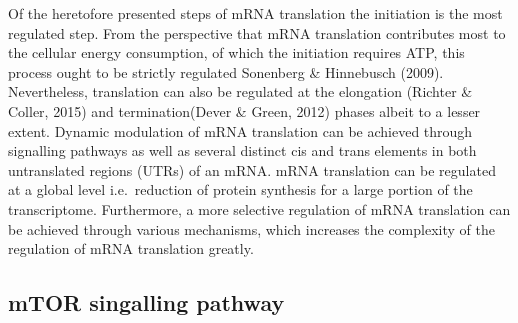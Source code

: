 \documentclass[
  12pt,
  openany]{book}
\begin{document}
Of the heretofore presented steps of mRNA translation the initiation is the most regulated step. From the perspective that mRNA translation contributes most to the cellular energy consumption, of which the initiation requires ATP, this process ought to be strictly regulated Sonenberg \& Hinnebusch (2009). Nevertheless, translation can also be regulated at the elongation (Richter \& Coller, 2015) and termination(Dever \& Green, 2012) phases albeit to a lesser extent. Dynamic modulation of mRNA translation can be achieved through signalling pathways as well as several distinct cis and trans elements in both untranslated regions (UTRs) of an mRNA. mRNA translation can be regulated at a global level i.e.~reduction of protein synthesis for a large portion of the transcriptome. Furthermore, a more selective regulation of mRNA translation can be achieved through various mechanisms, which increases the complexity of the regulation of mRNA translation greatly.

\subsection{mTOR singalling pathway}
\end{document}
